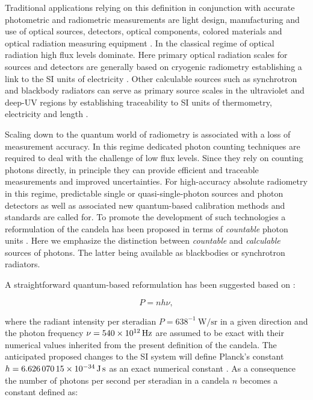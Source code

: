 		Traditional applications relying on this definition in conjunction with accurate photometric and radiometric measurements are light design, manufacturing and use of optical sources, detectors, optical components, colored materials and optical radiation measuring equipment \cite{zwinckels::paper}. In the classical regime of optical radiation high flux levels dominate. Here primary optical radiation scales for sources and detectors are generally based on cryogenic radiometry establishing a link to the SI units of electricity \cite{Cheung2007::5}. Other calculable sources such as synchrotron and blackbody radiators can serve as primary source scales in the ultraviolet and deep-UV regions by establishing traceability to SI units of thermometry, electricity and length \cite{zwinckels::paper, Cheung2007}.

		Scaling down to the quantum world of radiometry is associated with a loss of measurement accuracy. In this regime dedicated photon counting techniques are required to deal with the challenge of low flux levels. Since they rely on counting photons directly, in principle they can provide efficient and traceable measurements and improved uncertainties. For high-accuracy absolute radiometry in this regime, predictable single or quasi-single-photon sources and photon detectors as well as associated new quantum-based calibration methods and standards are called for. To promote the development of such technologies a reformulation of the candela has been proposed in terms of \emph{countable} photon units \cite{zwinckels::paper, Cheung2007, Milton, Martin (14 November 2016). Highlights in the work of the BIPM in 2016, www.quantumcandela.org}. Here we emphasize the distinction between \emph{countable} and \emph{calculable} sources of photons. The latter being available as blackbodies or synchrotron radiators.

		A straightforward quantum-based reformulation has been suggested based on \cite{Cheung2007, zwinckels::paper}:

		\begin{equation}
			P = n h \nu,
		\end{equation}

		where the radiant intensity per steradian $P = 638^{-1} \SI{}{\watt\per\steradian}$ in a given direction and the photon frequency $\nu = \SI{540d12}{\hertz}$ are assumed to be exact with their numerical values inherited from the present definition of the candela. The anticipated proposed changes to the SI system will define Planck's constant $h = \SI{6.62607015d-34}{\joule\second}$ as an exact numerical constant \cite{porposal}. As a consequence the number of photons per second per steradian in a candela $n$ becomes a constant defined as:


